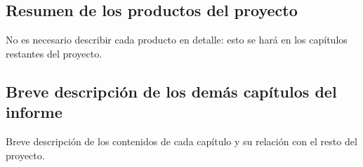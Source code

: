 \subsection{Resumen de los productos del proyecto}

No es necesario describir cada producto en detalle: esto se hará en los capítulos restantes del proyecto.

\subsection{Breve descripción de los demás capítulos del informe}

Breve descripción de los contenidos de cada capítulo y su relación con el resto del proyecto.
